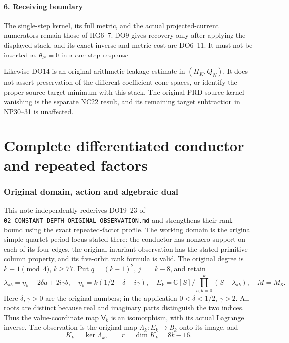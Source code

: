 \documentclass[11pt]{article}
\begin{document}
\subsection{6. Receiving boundary}\label{pdepth:receiving-boundary}

The single-step kernel, its full metric, and the actual projected-current numerators remain those of HG6--7. DO9 gives recovery only after applying the displayed stack, and its exact inverse and metric cost are DO6--11. It must not be inserted as \(\theta_N=0\) in a one-step response.

Likewise DO14 is an original arithmetic leakage estimate in \((H_K,Q_N)\). It does not assert preservation of the different coefficient-cone spaces, or identify the proper-source target minimum with this stack. The original PRD source-kernel vanishing is the separate NC22 result, and its remaining target subtraction in NP30--31 is unaffected.


\endgroup

\clearpage\begingroup
\part*{Complete differentiated conductor and repeated factors}
\newcommand{\pdiffC}{\mathbb C}
\newcommand{\pdiffim}{\operatorname{im}}
\newcommand{\pdiffrank}{\operatorname{rank}}
\newcommand{\pdiffdiag}{\operatorname{diag}}
\newcommand{\pdiffSpan}{\operatorname{span}}



\section{Original domain, action and algebraic dual}
This note independently rederives DO19--23 of
\texttt{02\_CONSTANT\_DEPTH\_ORIGINAL\_OBSERVATION.md} and strengthens
their rank bound using the exact repeated-factor profile.  The working
domain is the original simple-quartet period locus stated there: the
conductor has nonzero support on each of its four edges, the original
invariant observation has the stated primitive-column property, and its
five-orbit rank formula is valid.  The original degree is
$k\equiv1\pmod4$, $k\ge77$.  Put $q=(k+1)^2$, $j_-=k-8$, and retain
\[
 \lambda_{ab}=\eta_k+2\delta a+2i\gamma b,\quad
 \eta_k=k(1/2-\delta-i\gamma),\quad
 E_k=\pdiffC[S]/\prod_{a,b=0}^k(S-\lambda_{ab}),
 \quad M=M_S.                                                   \tag{DC1}
\]
Here $\delta,\gamma>0$ are the original numbers; in the application
$0<\delta<1/2$, $\gamma>2$.  All roots are distinct because real and
imaginary parts distinguish the two indices.  Thus the value-coordinate
map $\mathsf V_k$ is an isomorphism, with its actual Lagrange inverse.
The observation is the original map $\Lambda_k:E_k\to B_k$ onto its
image, and
\[
 K_k=\ker\Lambda_k,\qquad r=\dim K_k=8k-16.                      \tag{DC2}
\]
\end{document}
